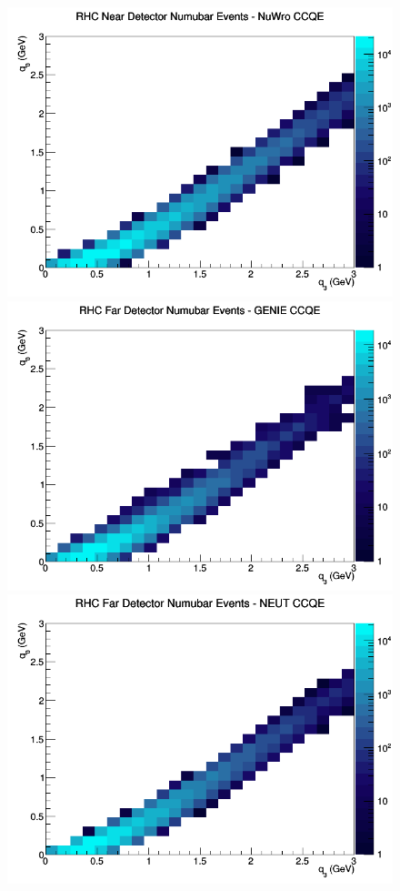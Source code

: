 \documentclass[12pt]{article}
\begin{document}
\begin{figure}[h]
\includegraphics[width=\linewidth]{q0_q3/nominal/CCQE_RHC_ND_numubar_q3_q0_NuWro.png}
\endminipage
\newline
{}
\includegraphics[width=\linewidth]{q0_q3/nominal/CCQE_RHC_FD_numubar_q3_q0_GENIE.png}
\endminipage
{}
\includegraphics[width=\linewidth]{q0_q3/nominal/CCQE_RHC_FD_numubar_q3_q0_NEUT.png}

\end{figure}
\end{document}
